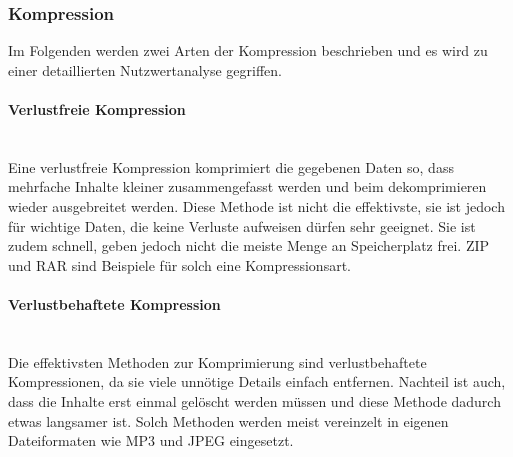 \subsubsection{Kompression}
Im Folgenden werden zwei Arten der Kompression beschrieben und es wird zu einer detaillierten Nutzwertanalyse gegriffen.
\begin{indentE}\mbox{}
	\paragraph{Verlustfreie Kompression}\mbox{}\\
	Eine verlustfreie Kompression komprimiert die gegebenen Daten so, dass mehrfache Inhalte kleiner zusammengefasst werden und beim dekomprimieren wieder ausgebreitet werden. Diese Methode ist nicht die effektivste, sie ist jedoch für wichtige Daten, die keine Verluste aufweisen dürfen sehr geeignet. Sie ist zudem schnell, geben jedoch nicht die meiste Menge an Speicherplatz frei. ZIP und RAR sind Beispiele für solch eine Kompressionsart. 
	
	\paragraph{Verlustbehaftete Kompression}\mbox{}\\
	Die effektivsten Methoden zur Komprimierung sind verlustbehaftete Kompressionen, da sie viele unnötige Details einfach entfernen. Nachteil ist auch, dass die Inhalte erst einmal gelöscht werden müssen und diese Methode dadurch etwas langsamer ist. Solch Methoden werden meist vereinzelt in eigenen Dateiformaten wie MP3 und JPEG eingesetzt.
	

\end{indentE}

